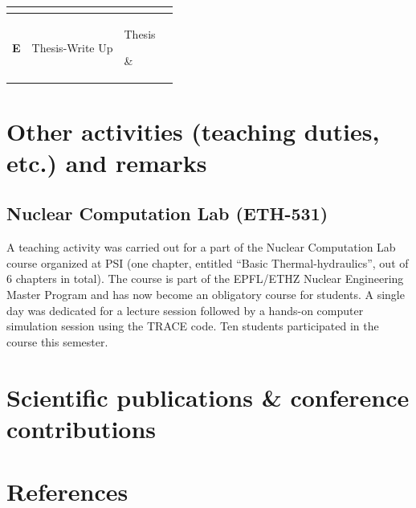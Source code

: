 \documentclass[11pt,titlepage]{article}
\begin{document}
\begin{table}[h!]
\begin{center}
\begin{tabular}{c l l l}
{\begin{itemize}[leftmargin=1em,itemsep=1pt,parsep=0pt]
					\end{itemize}}\\ \hline
				\textbf{E} 
				& \parbox[c]{0.2\textwidth}{
					Thesis-Write Up}
				& \parbox[c]{0.2\textwidth}{%
					Thesis} 
				& \\ 
			\bottomrule[1.5pt]
		\end{tabular}
	\end{center}
\end{table}

\section{Other activities (teaching duties, etc.) and remarks}

\subsection{Nuclear Computation Lab (ETH-531)}

A teaching activity was carried out for a part of the Nuclear Computation Lab 
course organized at PSI (one chapter, entitled ``Basic Thermal-hydraulics'', out of 
6 chapters in total). 
The course is part of the EPFL/ETHZ Nuclear Engineering Master Program and has 
now become an obligatory course for students.
A single day was dedicated for a lecture session followed by a hands-on computer
simulation session using the TRACE code.
Ten students participated in the course this semester.

\section{Scientific publications \& conference contributions}

\nocite{Wicaksono2014a}
\nocite{Wicaksono2014b}
\nocite{Wicaksono2014c}
\nocite{Wicaksono2015a}
\nocite{Wicaksono2015b}
\nocite{Wicaksono2015c}

\section{References}

\printbibliography[heading=none]
\end{document}
